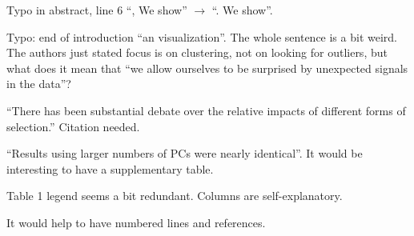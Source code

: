 
\begin{point}{}
Typo in abstract, line 6 ``, We show'' $\rightarrow$ ``. We show''.
\end{point}


\begin{point}{}
Typo: end of introduction ``an visualization''. The whole sentence is a bit weird. The authors just
stated focus is on clustering, not on looking for outliers, but what does it mean that ``we allow
ourselves to be surprised by unexpected signals in the data''?
\end{point}


\begin{point}{}
``There has been substantial debate over the relative impacts of different forms of selection.''
Citation needed.
\end{point}


\begin{point}{}
``Results using larger numbers of PCs were nearly identical''. It would be interesting to have a
supplementary table.
\end{point}


\begin{point}{}
Table 1 legend seems a bit redundant. Columns are self-explanatory.
\end{point}


\begin{point}{}
It would help to have numbered lines and references.
\end{point}

